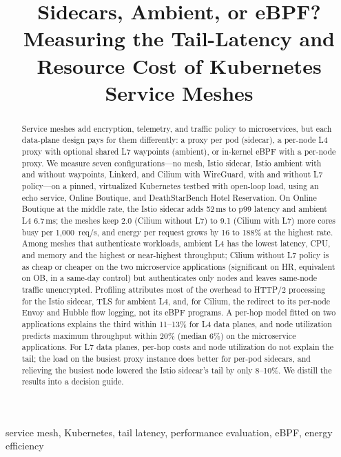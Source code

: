 \documentclass[conference]{IEEEtran}
\begin{document}
\title{Sidecars, Ambient, or eBPF? Measuring the Tail-Latency and Resource Cost of Kubernetes Service Meshes}

\author{
}

\maketitle

\begin{abstract}
Service meshes add encryption, telemetry, and traffic policy to microservices, but each data-plane design pays for
them differently: a proxy per pod (sidecar), a per-node L4 proxy with optional shared L7 waypoints (ambient), or
in-kernel eBPF with a per-node proxy. We measure seven configurations---no mesh, Istio sidecar, Istio ambient with and
without waypoints, Linkerd, and Cilium with WireGuard, with and without L7 policy---on a pinned, virtualized
Kubernetes testbed with open-loop load, using an echo service, Online Boutique, and DeathStarBench Hotel
Reservation. On Online Boutique at the middle rate, the Istio sidecar adds 52\,ms to p99 latency and ambient L4
6.7\,ms; the meshes keep 2.0 (Cilium without L7) to 9.1 (Cilium with L7) more cores busy per 1{,}000~req/s,
and energy per request grows by 16 to 188\% at the highest rate. Among meshes that authenticate workloads,
ambient L4 has the lowest latency, CPU, and memory and the highest or near-highest throughput; Cilium without
L7 policy is as cheap or cheaper on the two microservice applications (significant on HR, equivalent on OB, in a same-day control) but authenticates only nodes and leaves same-node traffic unencrypted. Profiling attributes most of the overhead to HTTP/2 processing for the Istio sidecar,
TLS for ambient L4, and, for Cilium, the redirect to its per-node Envoy and Hubble flow logging, not its eBPF
programs. A per-hop model fitted on two applications explains the third within 11--13\% for L4 data planes, and
node utilization predicts maximum throughput within 20\% (median 6\%) on the microservice applications. For L7 data planes, per-hop
costs and node utilization do not explain the tail; the load on the busiest proxy instance does better for
per-pod sidecars, and relieving the busiest node lowered the Istio sidecar's tail by only 8--10\%. We distill the results
into a decision guide.
\end{abstract}

\begin{IEEEkeywords}
service mesh, Kubernetes, tail latency, performance evaluation, eBPF, energy efficiency
\end{IEEEkeywords}
\end{document}
